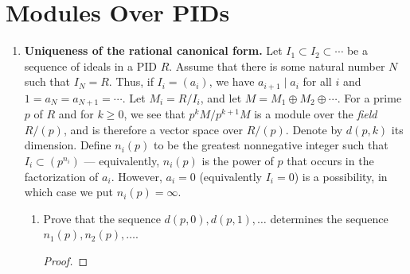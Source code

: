\documentclass[../psets.tex]{subfiles}
\begin{document}
\section{Modules Over PIDs}
\begin{enumerate}
    \item {}\textbf{Uniqueness of the rational canonical form.} Let $I_1\subset I_2\subset\cdots$ be a sequence of ideals in a PID $R$. Assume that there is some natural number $N$ such that $I_N=R$. Thus, if $I_i=(a_i)$, we have $a_{i+1}\mid a_i$ for all $i$ and $1=a_N=a_{N+1}=\cdots$. Let $M_i=R/I_i$, and let $M=M_1\oplus M_2\oplus\cdots$. For a prime $p$ of $R$ and for $k\geq 0$, we see that $p^kM/p^{k+1}M$ is a module over the \emph{field} $R/(p)$, and is therefore a vector space over $R/(p)$. Denote by $d(p,k)$ its dimension. Define $n_i(p)$ to be the greatest nonnegative integer such that $I_i\subset(p^{n_i})$ --- equivalently, $n_i(p)$ is the power of $p$ that occurs in the factorization of $a_i$. However, $a_i=0$ (equivalently $I_i=0$) is a possibility, in which case we put $n_i(p)=\infty$.
    \begin{enumerate}
        \item Prove that the sequence $d(p,0),d(p,1),\dots$ determines the sequence $n_1(p),n_2(p),\dots$.
        \begin{proof}


\end{proof}
\end{enumerate}
\end{enumerate}
\end{document}
